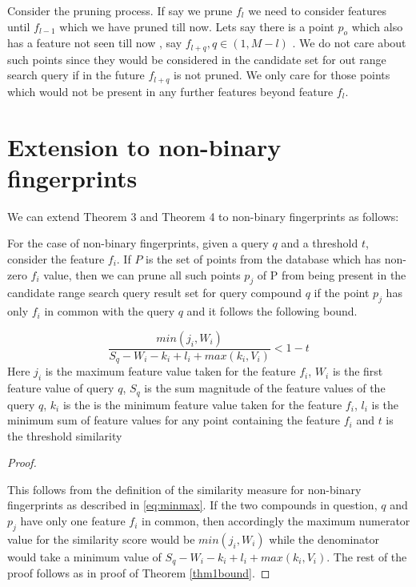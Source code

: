 Consider the pruning process. If say we prune $f_l$ we need to consider features until $f_{l-1}$ which we have pruned till now. Lets say there is a point $p_o$ which also has a feature not seen till now , say $f_{l+q}, q\in(1,M-l)$ . We do not care about such points since they would be considered in the candidate set for out range search query if in the future $f_{l+q}$ is not pruned. We only care for those points which would not be present in any further features beyond feature $f_l$. 

\section{Extension to non-binary fingerprints}	
\label{sec:prune2}

We can extend Theorem 3 and Theorem 4 to non-binary fingerprints as follows:



\begin{thm}
\label{thm3bound}
For the case of non-binary fingerprints, given a query $q$ and a threshold $t$, consider the feature $f_i$. If $P$ is the set of points from the database which has non-zero $f_i$ value, then we can prune all such points $p_j$ of P from being present in the candidate range search query result set for query compound $q$ if the point $p_j$ has only $f_i$ in common with the query $q$ and it follows the following bound. 

\begin{equation}
\label{eq:boun3}
\frac{min(j_i,W_i)}{S_q - W_i -k_i+ l_i + max (k_i, V_i)}  < 1-t
\end{equation}
Here $j_i$ is the maximum feature value taken for the feature $f_i$, $W_i$ is the first feature value of query $q$, $S_q$ is the sum magnitude of the feature values of the query $q$, $k_i$ is the is the minimum feature value taken for the feature $f_i$, $l_i$ is the minimum sum of feature values for any point containing the feature $f_i$ and $t$ is the threshold similarity


\end{thm}


\begin{proof}
\label{proof3}

This follows from the definition of the similarity measure for non-binary fingerprints as described in \autoref{eq:minmax}. If the two compounds in question, $q$  and $p_j$ have only one feature $f_i$ in common, then accordingly the maximum numerator value for the similarity score would be $min(j_i,W_i)$ while the denominator would take a minimum value of $S_q - W_i -k_i+ l_i + max (k_i, V_i)$. The rest of the proof follows as in proof of Theorem \autoref{thm1bound}.

\end{proof}



